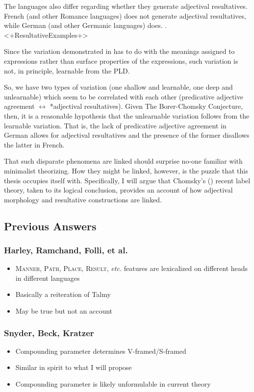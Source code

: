 \documentclass[letterpaper,12pt]{article}
\begin{document}
The languages also differ regarding whether they generate adjectival resultatives.
French (and other Romance languages) does not generate adjectival resultatives, while German (and other Germanic languages) does.
\ex. <+ResultativeExamples+> 

Since the variation demonstrated in \Last has to do with the meanings assigned to expressions rather than surface properties of the expressions, such variation is not, in principle, learnable from the PLD.

So, we have two types of variation (one shallow and learnable, one deep and unlearnable) which seem to be correlated with each other (predicative adjective agreement $\leftrightarrow$ *adjectival resultatives).
Given The Borer-Chomsky Conjecture, then, it is a reasonable hypothesis that the unlearnable variation follows from the learnable variation.
That is, the lack of predicative adjective agreement in German allows for adjectival resultatives and the presence of the former disallows the latter in French.

That such disparate phenomena are linked should surprise no-one familiar with minimalist theorizing.
How they might be linked, however, is the puzzle that this thesis occupies itself with.
Specifically, I will argue that Chomsky's (\citeyear{chomsky2013problems,chomsky2015problems}) recent label theory, taken to its logical conclusion, provides an account of how adjectival morphology and resultative constructions are linked.


\subsection{Previous Answers}
\subsubsection{Harley, Ramchand, Folli, et al.}
\begin{itemize}
  \item \textsc{Manner, Path, Place, Result}, \textit{etc.} features are lexicalized on different heads in different languages
  \item Basically a reiteration of Talmy
  \item May be true but not an account
\end{itemize}
\subsubsection{Snyder, Beck, Kratzer}
\begin{itemize}
  \item Compounding parameter determines V-framed/S-framed
  \item Similar in spirit to what I will propose
  \item Compounding parameter is likely unformulable in current theory
\end{itemize}
\end{document}

